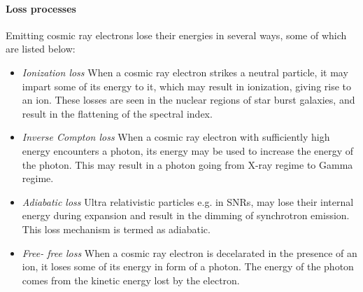 \documentclass[../main/thesis_msc.tex]{subfiles}
\begin{document}
\paragraph{Loss processes}
Emitting cosmic ray electrons lose their energies in several ways, some of which are listed below:
\begin{itemize}
\item \textit{Ionization loss} When a cosmic ray electron strikes a neutral particle, it may impart some of its energy to it, which may result in ionization, giving rise to an ion. These losses are seen in the nuclear regions of star burst galaxies, and result in the flattening of the spectral index.
\item \textit{Inverse Compton loss} When a cosmic ray electron with sufficiently high energy encounters a photon, its energy may be used to increase the energy of the photon. This may result in a photon going from X-ray regime to Gamma regime. 
\item \textit{Adiabatic loss} Ultra relativistic particles e.g. in SNRs, may lose their internal energy during expansion and result in the dimming of synchrotron emission. This loss mechanism is termed as adiabatic.
\item \textit{Free- free loss} When a cosmic ray electron is decelarated in the presence of an ion, it loses some of its energy in form of a photon. The energy of the photon comes from the kinetic energy lost by the electron.
\end{itemize}
\end{document}
